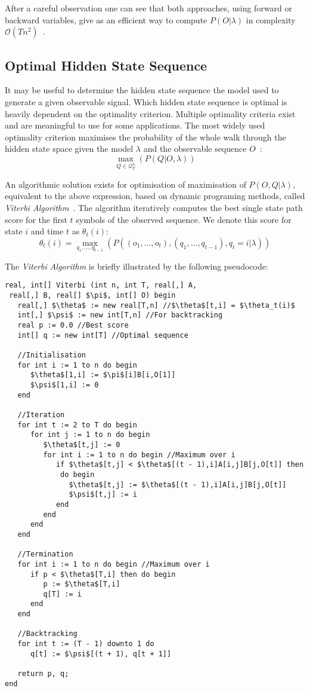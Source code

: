After a careful observation one can see that both approaches, using forward or backward variables, give as an efficient way to compute $P(O|\lambda)$ in complexity $\mathcal{O}(Tn^2)$~\cite{Rabiner89hmm}.

\subsection{Optimal Hidden State Sequence}

It may be useful to determine the hidden state sequence the model used to generate a given observable signal. Which hidden state sequence is optimal is heavily dependent on the optimality criterion. Multiple optimality criteria exist and are meaningful to use for some applications. The most widely used optimality criterion maximises the probability of the whole walk through the hidden state space given the model $\lambda$ and the observable sequence $O$~\cite{Rabiner89hmm}:
$$\max_{Q\in\mathcal{Q}_T^\lambda}(P(Q|O, \lambda))$$

An algorithmic solution exists for optimisation of maximisation of $P(O, Q|\lambda)$, equivalent to the above expression, based on dynamic programing methods, called \emph{Viterbi Algorithm}~\cite{Viterbi1967, Forney1973}. The algorithm iteratively computes the best single state path score for the first $t$ symbols of the observed sequence. We denote this score for state $i$ and time $t$ as $\theta_t(i)$:
$$\theta_t(i) = \max_{q_1, ..., q_{t-1}}(P((o_1, ..., o_t), (q_1, ..., q_{t-1}), q_t=i|\lambda))$$

The \emph{Viterbi Algorithm} is briefly illustrated by the following pseudocode:
\begin{lstlisting}[mathescape=true]
real, int[] Viterbi (int n, int T, real[,] A,
 real[,] B, real[] $\pi$, int[] O) begin
   real[,] $\theta$ := new real[T,n] //$\theta$[t,i] = $\theta_t(i)$
   int[,] $\psi$ := new int[T,n] //For backtracking
   real p := 0.0 //Best score
   int[] q := new int[T] //Optimal sequence
   
   //Initialisation
   for int i := 1 to n do begin
      $\theta$[1,i] := $\pi$[i]B[i,O[1]]
      $\psi$[1,i] := 0
   end
   
   //Iteration
   for int t := 2 to T do begin
      for int j := 1 to n do begin
         $\theta$[t,j] := 0
         for int i := 1 to n do begin //Maximum over i
            if $\theta$[t,j] < $\theta$[(t - 1),i]A[i,j]B[j,O[t]] then
             do begin
               $\theta$[t,j] := $\theta$[(t - 1),i]A[i,j]B[j,O[t]]
               $\psi$[t,j] := i
            end
         end
      end
   end
   
   //Termination
   for int i := 1 to n do begin //Maximum over i
      if p < $\theta$[T,i] then do begin
         p := $\theta$[T,i]
         q[T] := i
      end
   end
   
   //Backtracking
   for int t := (T - 1) downto 1 do
      q[t] := $\psi$[(t + 1), q[t + 1]]

   return p, q;
end
\end{lstlisting}


